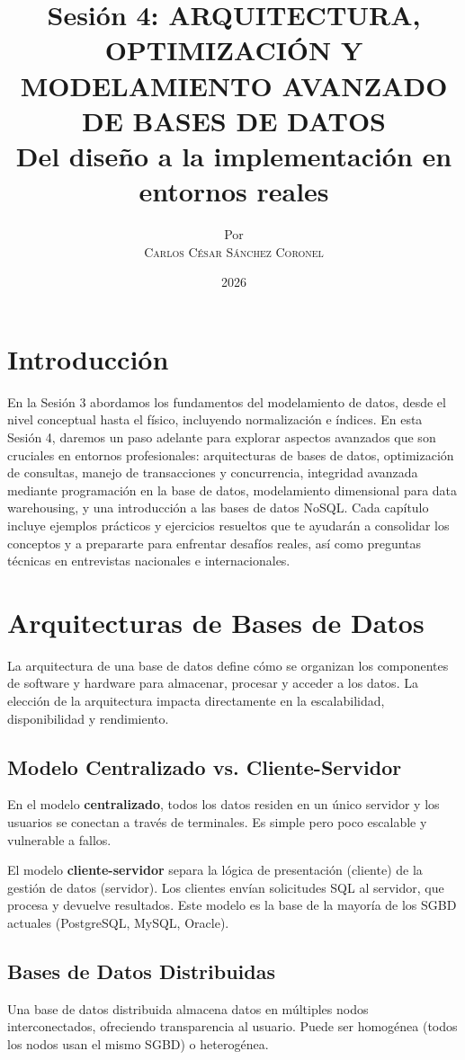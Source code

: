 \documentclass[12pt,a4paper,openany,oneside]{book}
\title{
    \Huge \textbf{Sesión 4: ARQUITECTURA, OPTIMIZACIÓN Y MODELAMIENTO AVANZADO DE BASES DE DATOS} \\
    \Large Del diseño a la implementación en entornos reales
}
\author{
    \small Por \\ \vspace{0.2cm}
    \Large \textsc{Carlos César Sánchez Coronel}
}
\date{2026}
\begin{document}
\maketitle

\tableofcontents
{}

\chapter{Introducción}
En la Sesión 3 abordamos los fundamentos del modelamiento de datos, desde el nivel conceptual hasta el físico, incluyendo normalización e índices. En esta Sesión 4, daremos un paso adelante para explorar aspectos avanzados que son cruciales en entornos profesionales: arquitecturas de bases de datos, optimización de consultas, manejo de transacciones y concurrencia, integridad avanzada mediante programación en la base de datos, modelamiento dimensional para data warehousing, y una introducción a las bases de datos NoSQL. Cada capítulo incluye ejemplos prácticos y ejercicios resueltos que te ayudarán a consolidar los conceptos y a prepararte para enfrentar desafíos reales, así como preguntas técnicas en entrevistas nacionales e internacionales.

\chapter{Arquitecturas de Bases de Datos}
La arquitectura de una base de datos define cómo se organizan los componentes de software y hardware para almacenar, procesar y acceder a los datos. La elección de la arquitectura impacta directamente en la escalabilidad, disponibilidad y rendimiento.

\section{Modelo Centralizado vs. Cliente-Servidor}
En el modelo \textbf{centralizado}, todos los datos residen en un único servidor y los usuarios se conectan a través de terminales. Es simple pero poco escalable y vulnerable a fallos.

El modelo \textbf{cliente-servidor} separa la lógica de presentación (cliente) de la gestión de datos (servidor). Los clientes envían solicitudes SQL al servidor, que procesa y devuelve resultados. Este modelo es la base de la mayoría de los SGBD actuales (PostgreSQL, MySQL, Oracle).

\section{Bases de Datos Distribuidas}
Una base de datos distribuida almacena datos en múltiples nodos interconectados, ofreciendo transparencia al usuario. Puede ser homogénea (todos los nodos usan el mismo SGBD) o heterogénea.
\end{document}
